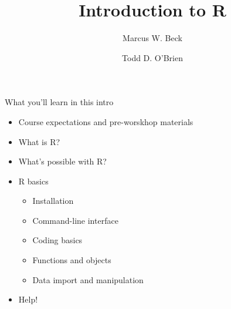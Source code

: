 \documentclass[xcolor=svgnames]{beamer}\usepackage[]{graphicx}\usepackage[]{color}
\begin{document}
\title[Introduction to R]{Introduction to R}

\author[M. Beck, T. O'Brien]{Marcus W. Beck \and Todd D. O'Brien}

\date{}



\begin{frame}{What you'll learn in this intro}
\begin{itemize}
\itemsep15pt
\item Course expectations and pre-worskhop materials
\item What is R?
\item What's possible with R?
\item R basics
\begin{itemize}
\item Installation
\item Command-line interface
\item Coding basics
\item Functions and objects
\item Data import and manipulation
\end{itemize}
\item Help!\\~\\
\end{itemize}
\end{frame}
\end{document}

